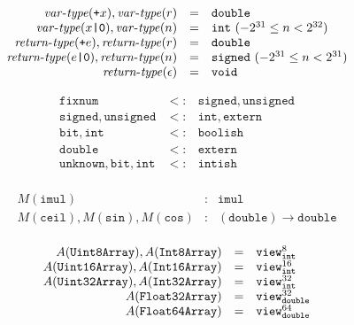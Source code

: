 \documentclass{article}
\newcommand{\vartype}{\mathit{var}\mbox{-}\mathit{type}}
\newcommand{\rettype}{\mathit{return}\mbox{-}\mathit{type}}
\newcommand{\funty}[2]{({#1}) \rightarrow {#2}}
\newcommand{\mathjs}[1]{\mbox{\texttt{{#1}}}}
\newcommand{\mathjssm}[1]{\mbox{\texttt{\scriptsize {#1}}}}
\newcommand{\bit}{\mathtt{bit}}
\newcommand{\unsigned}{\mathtt{unsigned}}
\newcommand{\intsm}{\mathjssm{int}}
\newcommand{\doublesm}{\mathjssm{double}}
\newcommand{\signed}{\mathtt{signed}}
\newcommand{\fixnum}{\mathtt{fixnum}}
\newcommand{\double}{\mathtt{double}}
\newcommand{\view}[2]{\mathtt{view}^{#1}_{#2}}
\newcommand{\extern}{\mathtt{extern}}
\newcommand{\unk}{\mathtt{unknown}}
\newcommand{\void}{\mathtt{void}}
\newcommand{\todouble}[1]{\mathjs{+}{#1}}
\renewcommand{\int}{\mathtt{int}}
\newcommand{\boolish}{\mathtt{boolish}}
\newcommand{\imul}{\mathtt{imul}}
\newcommand{\intish}{\mathtt{intish}}
\begin{document}
\[
\begin{array}{rcl}
\vartype(\todouble{x}), \vartype(r) & = & \double \\
\vartype(x\mathjs{|0}), \vartype(n) & = & \int \mbox{ $(-2^{31} \leq n < 2^{32})$} \\
\rettype(\todouble{e}), \rettype(r) & = & \double \\
\rettype(e\mathjs{|0}), \rettype(n) & = & \signed \mbox{ $(-2^{31} \leq n < 2^{31})$} \\
\rettype(\epsilon)                  & = & \void \\
\end{array}
\]

\[
\begin{array}{rcl}
\fixnum            & <: & \signed, \unsigned \\
\signed, \unsigned & <: & \int, \extern \\
\bit, \int         & <: & \boolish \\
\double            & <: & \extern \\
\unk, \bit, \int   & <: & \intish \\
\end{array}
\]

\[
\begin{array}{rcl}
M(\imul) & : & \imul \\
M(\mathtt{ceil}), M(\mathtt{sin}), M(\mathtt{cos}) & : & \funty{\double}{\double} \\
\end{array}
\]

\[
\begin{array}{rcl}
A(\mathtt{Uint8Array}), A(\mathtt{Int8Array})   & = & \view{8}{\intsm} \\
A(\mathtt{Uint16Array}), A(\mathtt{Int16Array}) & = & \view{16}{\intsm} \\
A(\mathtt{Uint32Array}), A(\mathtt{Int32Array}) & = & \view{32}{\intsm} \\
A(\mathtt{Float32Array})                        & = & \view{32}{\doublesm} \\
A(\mathtt{Float64Array})                        & = & \view{64}{\doublesm} \\
\end{array}
\]
\end{document}
